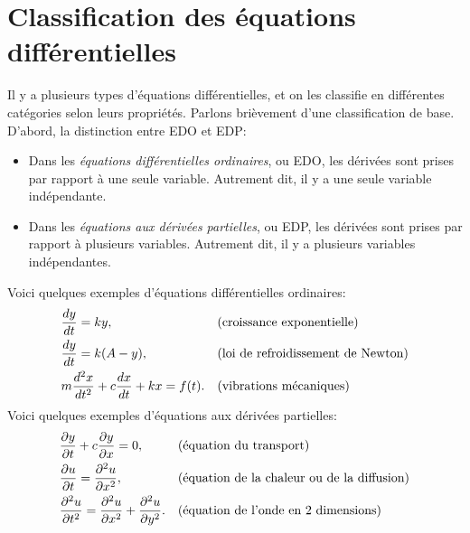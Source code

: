 \sectionnewpage
\section{Classification des équations différentielles}
\label{classification:section}

Il y a plusieurs types d'équations différentielles, et on les classifie en différentes catégories selon leurs propriétés.
Parlons brièvement d'une classification de base.  D'abord, la distinction entre EDO et EDP:
\begin{itemize}
\item
	Dans les \emph{équations différentielles ordinaires}, ou EDO,
	les dérivées sont prises par rapport à une seule variable.  Autrement dit, il y a une seule variable indépendante.

\item
	Dans les \emph{équations aux dérivées partielles}, ou EDP,
	les dérivées sont prises par rapport à plusieurs variables.  Autrement dit, il y a plusieurs variables indépendantes.
\end{itemize}

Voici quelques exemples d'équations différentielles ordinaires:
\begin{align*}
	& \frac{d y}{dt} = ky,  & & \text{(croissance exponentielle\index{exponential growth})} \\
	& \frac{d y}{dt} = k(A-y),  & & \text{(\myindex{loi de refroidissement de Newton})} \\
	& m \frac{d^2 x}{dt^2} + c \frac{dx}{dt} + kx = f(t) . & &
\text{(vibrations mécaniques\index{mechanical vibrations})}
\end{align*}
Voici quelques exemples d'équations aux dérivées partielles:
\begin{align*}
	& \frac{\partial y}{\partial t} + c \frac{\partial y}{\partial x} = 0, & &
		\text{(équation du transport\index{Équation du transport})} \\
	& \frac{\partial u}{\partial t} = \frac{\partial^2 u}{\partial x^2},  & &
		\text{(équation de la chaleur ou de la diffusion\index{Équation de la chaleur/diffusion})} \\
	& \frac{\partial^2 u}{\partial t^2} = \frac{\partial^2 u}{\partial x^2} + \frac{\partial^2 u}{\partial y^2} . & &
		\text{(équation de l'onde en 2 dimensions\index{Équation de l'onde en deux dimensions})}
\end{align*}

